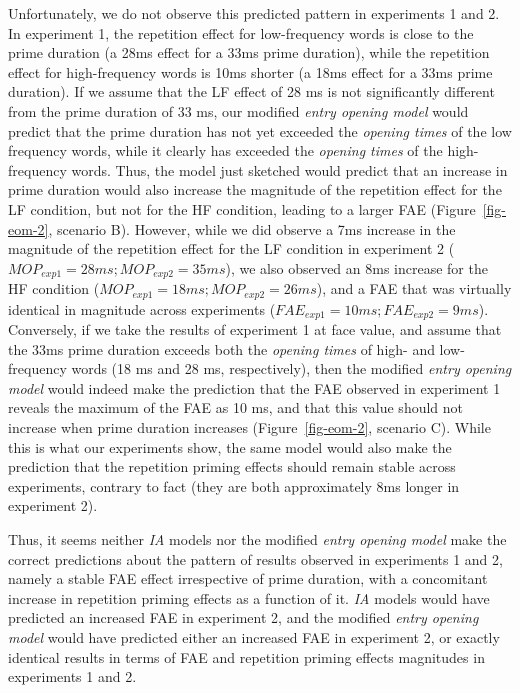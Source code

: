 \documentclass[
]{interact}
\begin{document}
Unfortunately, we do not observe this predicted pattern in experiments 1
and 2. In experiment 1, the repetition effect for low-frequency words is
close to the prime duration (a 28ms effect for a 33ms prime duration),
while the repetition effect for high-frequency words is 10ms shorter (a
18ms effect for a 33ms prime duration). If we assume that the LF effect
of 28 ms is not significantly different from the prime duration of 33
ms, our modified \emph{entry opening model} would predict that the prime
duration has not yet exceeded the \emph{opening times} of the low
frequency words, while it clearly has exceeded the \emph{opening times}
of the high-frequency words. Thus, the model just sketched would predict
that an increase in prime duration would also increase the magnitude of
the repetition effect for the LF condition, but not for the HF
condition, leading to a larger FAE (Figure~\ref{fig-eom-2}, scenario B).
However, while we did observe a 7ms increase in the magnitude of the
repetition effect for the LF condition in experiment 2
(\(MOP_{exp1}=28ms; MOP_{exp2}=35ms\)), we also observed an 8ms increase
for the HF condition (\(MOP_{exp1}=18ms; MOP_{exp2}=26ms\)), and a FAE
that was virtually identical in magnitude across experiments
(\(FAE_{exp1}=10ms; FAE_{exp2}=9ms\)). Conversely, if we take the
results of experiment 1 at face value, and assume that the 33ms prime
duration exceeds both the \emph{opening times} of high- and
low-frequency words (18 ms and 28 ms, respectively), then the modified
\emph{entry opening model} would indeed make the prediction that the FAE
observed in experiment 1 reveals the maximum of the FAE as 10 ms, and
that this value should not increase when prime duration increases
(Figure~\ref{fig-eom-2}, scenario C). While this is what our experiments
show, the same model would also make the prediction that the repetition
priming effects should remain stable across experiments, contrary to
fact (they are both approximately 8ms longer in experiment 2).

Thus, it seems neither \emph{IA} models nor the modified \emph{entry
opening model} make the correct predictions about the pattern of results
observed in experiments 1 and 2, namely a stable FAE effect irrespective
of prime duration, with a concomitant increase in repetition priming
effects as a function of it. \emph{IA} models would have predicted an
increased FAE in experiment 2, and the modified \emph{entry opening
model} would have predicted either an increased FAE in experiment 2, or
exactly identical results in terms of FAE and repetition priming effects
magnitudes in experiments 1 and 2.
\end{document}
